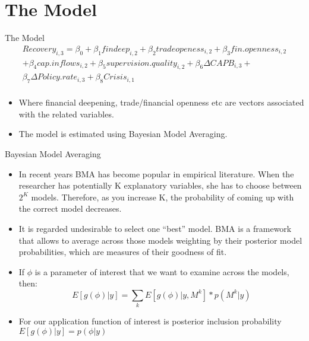 \documentclass[xcolor=dvipsnames]{beamer}
\begin{document}
\section{The Model}
\begin{frame}{The Model}
\begin{equation}
\begin{split}
Recovery_{i,3}=\beta_0+\beta_{1}findeep_{i,2}+\beta_{2}tradeopeness_{i,2}+\beta_3fin.openness_{i,2} \\
+\beta_4cap.inflows_{i,2}+\beta_5supervision.quality_{i,2}+\beta_6\Delta{}CAPB_{i,3}+ \\
\beta_7\Delta{}Policy.rate_{i,3}+\beta_8Crisis_{i,1}    \\
\end{split}
\end{equation}
\begin{itemize}
\item Where financial deepening, trade/financial openness etc are vectors associated with the related variables.
\item The model is estimated using Bayesian Model Averaging.
\end{itemize}
\end{frame}
\begin{frame}{Bayesian Model Averaging}

\begin{itemize}
\item In recent years BMA has become popular in empirical literature. When the researcher has potentially K explanatory variables, she has to choose between $2^K$ models. Therefore, as you increase K, the probability of coming up with the correct model decreases.
\item It is regarded undesirable to select one “best” model. BMA is a framework that allows to average across those models weighting by their posterior model probabilities, which are measures of their goodness of fit.
\item If $\phi{}$ is a parameter of interest that we want to examine across the models, then:
\begin{equation}
E[g(\phi{})|y]=\sum_kE[g(\phi{})|y,M^k]*p(M^k|y)
\end{equation}
\item For our application function of interest is posterior inclusion probability $E[g(\phi{})|y]=p(\phi{}|y)$
\end{itemize}
\end{frame}
\end{document}
